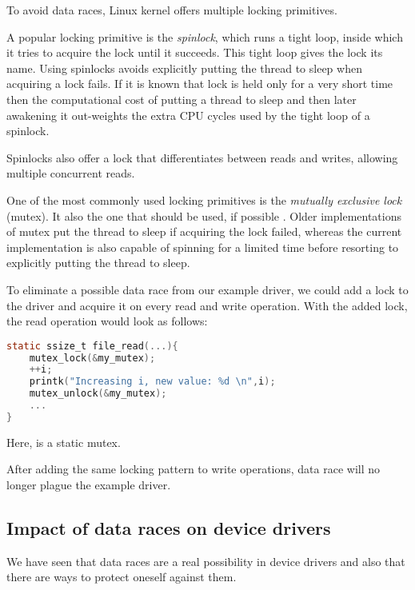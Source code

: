 \documentclass[..thesis.tex]{subfiles}
\begin{document}

To avoid data races, Linux kernel offers multiple locking primitives. 

A popular locking primitive is the \textit{spinlock}, which runs a tight loop, inside which it tries to acquire the lock until it succeeds.
This tight loop gives the lock its name. Using spinlocks avoids explicitly putting the thread to sleep when acquiring a lock fails.
If it is known that lock is held only for a very short time then the computational cost of putting a thread to sleep and then later awakening
it out-weights the extra CPU cycles used by the tight loop of a spinlock.

Spinlocks also offer a lock that differentiates between reads and writes, allowing multiple concurrent reads.

One of the most commonly used locking primitives is the \textit{mutually exclusive lock} (mutex). It also the one that should be used, if possible
\cite[locking/mutex-design.txt]{torvalds_linux}. Older implementations of mutex put the thread to sleep if acquiring the lock failed,
whereas the current implementation is also capable of spinning for a limited time before resorting to explicitly putting the thread to sleep.

To eliminate a possible data race from our example driver, we could add a lock to the driver and acquire it on every read and write operation.
With the added lock, the read operation would look as follows:

\begin{lstlisting}[language=C,style=def]
static ssize_t file_read(...){
    mutex_lock(&my_mutex);
    ++i;
    printk("Increasing i, new value: %d \n",i);
    mutex_unlock(&my_mutex);
    ...
}
\end{lstlisting}

Here,  is a static mutex.

After adding the same locking pattern to write operations, data race will no longer plague the example driver.

\subsection{Impact of data races on device drivers}

We have seen that data races are a real possibility in device drivers and also that there are ways to protect oneself against them. 

\end{document}
